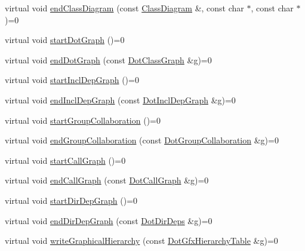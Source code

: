 \begin{DoxyCompactItemize}
\item 
virtual void \hyperlink{class_output_generator_a72364e74e0d834f01c2b5f5db5665c77}{end\+Class\+Diagram} (const \hyperlink{class_class_diagram}{Class\+Diagram} \&, const char $\ast$, const char $\ast$)=0
\item 
virtual void \hyperlink{class_output_generator_a60efbd7467b31058030731fe084a9db5}{start\+Dot\+Graph} ()=0
\item 
virtual void \hyperlink{class_output_generator_a3b268fc536acaca12748c9a729bd4a0b}{end\+Dot\+Graph} (const \hyperlink{class_dot_class_graph}{Dot\+Class\+Graph} \&\hyperlink{060__command__switch_8tcl_af08b4b5bfa9edf0b0a7dee1c2b2c29e0}{g})=0
\item 
virtual void \hyperlink{class_output_generator_a8f015b38b836904858cc1cd34f44363f}{start\+Incl\+Dep\+Graph} ()=0
\item 
virtual void \hyperlink{class_output_generator_a4bae4acba787ae56c9851ff5651ecff4}{end\+Incl\+Dep\+Graph} (const \hyperlink{class_dot_incl_dep_graph}{Dot\+Incl\+Dep\+Graph} \&\hyperlink{060__command__switch_8tcl_af08b4b5bfa9edf0b0a7dee1c2b2c29e0}{g})=0
\item 
virtual void \hyperlink{class_output_generator_a5c001113ef669b2043a9abbf1326f286}{start\+Group\+Collaboration} ()=0
\item 
virtual void \hyperlink{class_output_generator_ae0b99fc498e233c94240869ec423cb54}{end\+Group\+Collaboration} (const \hyperlink{class_dot_group_collaboration}{Dot\+Group\+Collaboration} \&\hyperlink{060__command__switch_8tcl_af08b4b5bfa9edf0b0a7dee1c2b2c29e0}{g})=0
\item 
virtual void \hyperlink{class_output_generator_ace8e9a8d3c193fe5b50f19d07882a51a}{start\+Call\+Graph} ()=0
\item 
virtual void \hyperlink{class_output_generator_a8e13dc9a74d4a508a314d328c9ee5841}{end\+Call\+Graph} (const \hyperlink{class_dot_call_graph}{Dot\+Call\+Graph} \&\hyperlink{060__command__switch_8tcl_af08b4b5bfa9edf0b0a7dee1c2b2c29e0}{g})=0
\item 
virtual void \hyperlink{class_output_generator_a02c3701bf94326612c1b4fcaf16c4011}{start\+Dir\+Dep\+Graph} ()=0
\item 
virtual void \hyperlink{class_output_generator_a5e97157957f1f86880eae04e4f0a202d}{end\+Dir\+Dep\+Graph} (const \hyperlink{class_dot_dir_deps}{Dot\+Dir\+Deps} \&\hyperlink{060__command__switch_8tcl_af08b4b5bfa9edf0b0a7dee1c2b2c29e0}{g})=0
\item 
virtual void \hyperlink{class_output_generator_ae5cf1278fa98872e8e40764af2499558}{write\+Graphical\+Hierarchy} (const \hyperlink{class_dot_gfx_hierarchy_table}{Dot\+Gfx\+Hierarchy\+Table} \&\hyperlink{060__command__switch_8tcl_af08b4b5bfa9edf0b0a7dee1c2b2c29e0}{g})=0

\end{DoxyCompactItemize}

